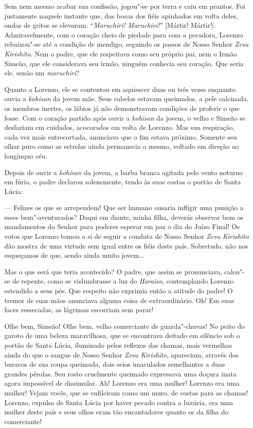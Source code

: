 Sem nem mesmo acabar sua confissão, jogou"-se por terra e caiu em
prantos. Foi justamente naquele instante que, das bocas dos fiéis apinhados em
volta deles, ondas de gritos se elevaram: ``\textit{Maruchiri!
Maruchiri!}'' [Mártir! Mártir!]. Admiravelmente, com o coração cheio de
piedade para com a pecadora, Lorenzo rebaixou"-se até a condição de
mendigo, seguindo os passos de Nosso Senhor \textit{Zesu Kirishito}.
Nem o padre, que ele respeitava como seu próprio pai, nem o Irmão
Simeão, que ele considerava seu irmão, ninguém conhecia seu coração.
Que seria ele, senão um \textit{maruchiri}? 

Quanto a Lorenzo, ele se contentou em aquiescer duas ou três vezes
enquanto ouvia a \textit{kohisan} da jovem mãe. Seus cabelos estavam
queimados, a pele calcinada, os membros inertes, os lábios já não
demonstravam condições de proferir o que fosse. Com o coração partido
após ouvir a \textit{kohisan} da jovem, o velho e Simeão se desfaziam
em cuidados, acocorados em volta de Lorenzo. Mas sua respiração, cada
vez mais entrecortada, anunciava que o fim estava próximo. Somente seu
olhar puro como as estrelas ainda permanecia o mesmo, voltado em
direção ao longínquo céu.

Depois de ouvir a \textit{kohisan} da jovem, a barba branca agitada pelo
vento noturno em fúria, o padre declarou solenemente, tendo às suas
costas o portão de Santa Lúcia:

--- Felizes os que se arrependem! Que ser humano ousaria infligir uma
punição a esses bem"-aventurados? Daqui em diante, minha filha, deverás
observar bem os mandamentos do Senhor para poderes esperar em paz o dia
do Juízo Final! Os votos que Lorenzo tomou a si de seguir a conduta de
Nosso Senhor \textit{Zesu Kirishito} dão mostra de uma virtude sem 
igual entre os fiéis deste país. Sobretudo, não nos esqueçamos de que,
sendo ainda muito jovem\ldots{}

Mas o que será que teria acontecido? O padre, que assim se pronunciava,
calou"-se de repente, como se vislumbrasse a luz do \textit{Haraiso},
contemplando Lorenzo estendido a seus pés. Que respeito não exprimia
então a atitude do padre! O tremor de suas mãos anunciava alguma coisa
de extraordinário. Oh! Em suas faces ressecadas, as lágrimas escorriam
sem parar!

Olhe bem, Simeão! Olhe bem, velho comerciante de guarda"-chuvas! No peito
do garoto de uma beleza maravilhosa, que se encontrava deitado em
silêncio sob o portão de Santa Lúcia, iluminado pelos reflexos das
chamas, mais vermelhas ainda do que o sangue de Nosso Senhor
\textit{Zesu Kirishito}, apareciam, através dos buracos de sua roupa
queimada, dois seios imaculados semelhantes a duas grandes pérolas. 
Seu rosto cruelmente queimado expressava uma doçura inata agora
impossível de dissimular. Ah! Lorenzo era uma mulher! Lorenzo era uma
mulher! Vejam vocês, que se enfileiram como um muro, de costas para as
chamas! Lorenzo, expulso de Santa Lúcia por haver pecado contra a
luxúria, era uma mulher deste país e seus olhos eram tão encantadores 
quanto os da filha do comerciante! 

